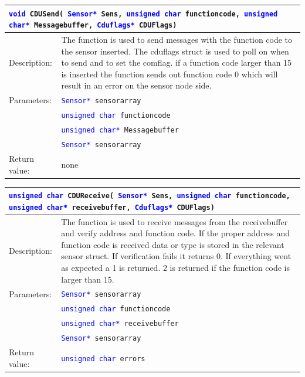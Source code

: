 \begin{table}[H]
\begin{tabular}{l p{12.5cm}}
\multicolumn{2}{p{15cm}}{\texttt{\textcolor{blue}{void} CDUSend( \texttt{\textcolor{blue}{Sensor*} Sens, \textcolor{blue}{unsigned char} functioncode, \textcolor{blue}{unsigned char*} Messagebuffer, \textcolor{blue}{Cduflags*} CDUFlags})}} \\
\hline
Description:& The function is used to send messages with the function code to the sensor inserted. The cduflags struct is used to poll on when to send and to set the comflag. if a function code larger than 15 is inserted the function sends out function code 0 which will result in an error on the sensor node side.\\
Parameters:&\texttt{\textcolor{blue}{Sensor*} sensorarray}\\
&\texttt{\textcolor{blue}{unsigned char} functioncode}\\
&\texttt{\textcolor{blue}{unsigned char*} Messagebuffer}\\
&\texttt{\textcolor{blue}{Sensor*} sensorarray}\\
Return value:&none\\
\end{tabular}
\end{table}

\begin{table}[H]
\begin{tabular}{l p{12.5cm}}
\multicolumn{2}{p{15cm}}{\texttt{\textcolor{blue}{unsigned char} CDUReceive( \texttt{\textcolor{blue}{Sensor*} Sens, \textcolor{blue}{unsigned char} functioncode, \textcolor{blue}{unsigned char*} receivebuffer, \textcolor{blue}{Cduflags*} CDUFlags})}} \\
\hline
Description:& The function is used to receive messages from the receivebuffer and verify address and function code. If the proper address and function code is received data or type is stored in the relevant sensor struct. If verification fails it returns 0. If everything went as expected a 1 is returned. 2 is returned if the function code is larger than 15.\\
Parameters:&\texttt{\textcolor{blue}{Sensor*} sensorarray}\\
&\texttt{\textcolor{blue}{unsigned char} functioncode}\\
&\texttt{\textcolor{blue}{unsigned char*} receivebuffer}\\
&\texttt{\textcolor{blue}{Sensor*} sensorarray}\\
Return value:&\texttt{\textcolor{blue}{unsigned char} errors}\\
\end{tabular}
\end{table}

